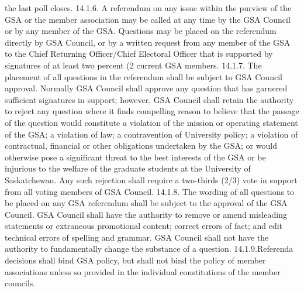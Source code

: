 \documentclass{article}
\begin{document}
the last poll closes. 
14.1.6. A referendum on any issue within the purview of the GSA or the 
member association may be called at any time by the GSA Council or 
by any member of the GSA. Questions may be placed on the 
referendum directly by GSA Council, or by a written request from any 
member of the GSA to the Chief Returning Officer/Chief Electoral 
Officer that is supported by signatures of at least two percent (2%
current GSA members. 
14.1.7. The placement of all questions in the referendum shall be subject to 
GSA Council approval. Normally GSA Council shall approve any 
question that has garnered sufficient signatures in support; however, 
GSA Council shall retain the authority to reject any question where it 
finds compelling reason to believe that the passage of the question 
would constitute a violation of the mission or operating statement of 
the GSA; a violation of law; a contravention of University policy; a 
violation of contractual, financial or other obligations undertaken by 
the GSA; or would otherwise pose a significant threat to the best 
interests of the GSA or be injurious to the welfare of the graduate 
students at the University of Saskatchewan. Any such rejection shall 
require a two-thirds (2/3) vote in support from all voting members of 
GSA Council. 
14.1.8. The wording of all questions to be placed on any GSA referendum 
shall be subject to the approval of the GSA Council. GSA Council 
 shall have the authority to remove or amend misleading statements or 
 extraneous promotional content; correct errors of fact; and edit 
 technical errors of spelling and grammar. GSA Council shall not have 
 the authority to fundamentally change the substance of a question. 
14.1.9.Referenda decisions shall bind GSA policy, but shall not bind the 
 policy of member associations unless so provided in the individual 
 constitutions of the member councils. 
\end{document}
